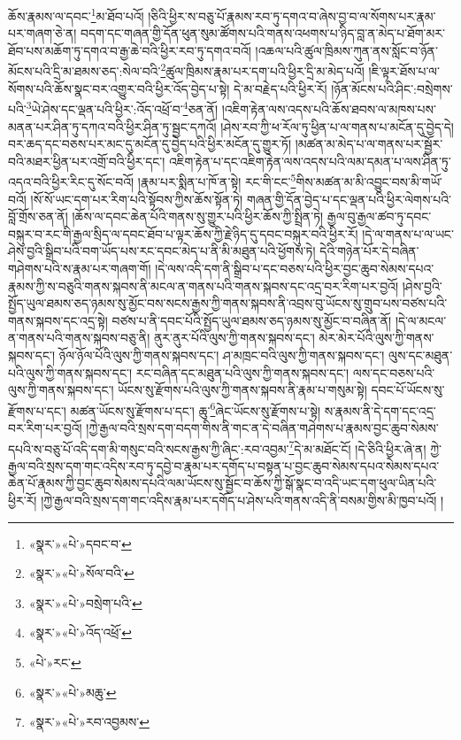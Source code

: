 ཆོས་རྣམས་ལ་དབང་\footnote{«སྣར་»«པེ་»དབང་བ་}མ་ཐོབ་པའོ། །ཅིའི་ཕྱིར་ས་བཅུ་པོ་རྣམས་རབ་ཏུ་དགའ་བ་ཞེས་བྱ་བ་ལ་སོགས་པར་རྣམ་པར་གཞག་ཅེ་ན། བདག་དང་གཞན་གྱི་དོན་ཕུན་སུམ་ཚོགས་པའི་གནས་འཕགས་པ་ཉིད་བླ་ན་མེད་པ་ཐོག་མར་ཐོབ་པས་མཆོག་ཏུ་དགའ་བ་རྒྱ་ཆེ་བའི་ཕྱིར་རབ་ཏུ་དགའ་བའོ། །འཆལ་པའི་ཚུལ་ཁྲིམས་ཀུན་ནས་སློང་བ་ཉོན་མོངས་པའི་དྲི་མ་ཐམས་ཅད་:སེལ་བའི་\footnote{«སྣར་»«པེ་»སོལ་བའི་}ཚུལ་ཁྲིམས་རྣམ་པར་དག་པའི་ཕྱིར་དྲི་མ་མེད་པའོ། །ཇི་ལྟར་ཐོས་པ་ལ་སོགས་པའི་ཆོས་སྣང་བར་འགྱུར་བའི་ཕྱིར་འོད་བྱེད་པ་སྟེ། དེ་མ་བརྗེད་པའི་ཕྱིར་རོ། །ཉོན་མོངས་པའི་ཤིང་:བསྲེགས་པའི་\footnote{«སྣར་»«པེ་»བསྲེག་པའི་}ཡེ་ཤེས་དང་ལྡན་པའི་ཕྱིར་:འོད་འཕྲོ་བ་\footnote{«སྣར་»«པེ་»འོད་འཕྲོ་}ཅན་ནོ། །འཇིག་རྟེན་ལས་འདས་པའི་ཆོས་ཐབས་ལ་མཁས་པས་མནན་པར་ཤིན་ཏུ་དཀའ་བའི་ཕྱིར་ཤིན་ཏུ་སྦྱང་དཀའོ། །ཤེས་རབ་ཀྱི་ཕ་རོལ་ཏུ་ཕྱིན་པ་ལ་གནས་པ་མངོན་དུ་བྱེད་དེ། བར་ཆད་དང་བཅས་པར་མང་དུ་མངོན་དུ་བྱེད་པའི་ཕྱིར་མངོན་དུ་གྱུར་ཏོ། །མཚན་མ་མེད་པ་ལ་གནས་པར་སྦྱོར་བའི་མཐར་ཕྱིན་པར་འགྲོ་བའི་ཕྱིར་དང་། འཇིག་རྟེན་པ་དང་འཇིག་རྟེན་ལས་འདས་པའི་ལམ་དམན་པ་ལས་ཤིན་ཏུ་འདའ་བའི་ཕྱིར་རིང་དུ་སོང་བའོ། །རྣམ་པར་སྨིན་པ་ཁོ་ན་སྟེ། རང་གི་ངང་\footnote{«པེ་»རང་}གིས་མཚན་མ་མི་འབྱུང་བས་མི་གཡོ་བའོ། །སོ་སོ་ཡང་དག་པར་རིག་པའི་སྟོབས་ཀྱིས་ཆོས་སྟོན་ཏེ། གཞན་གྱི་དོན་བྱེད་པ་དང་ལྡན་པའི་ཕྱིར་ལེགས་པའི་བློ་གྲོས་ཅན་ནོ། །ཆོས་ལ་དབང་ཆེན་པོའི་གནས་སུ་གྱུར་པའི་ཕྱིར་ཆོས་ཀྱི་སྤྲིན་ཏེ། རྒྱལ་བུ་རྒྱལ་ཚབ་ཏུ་དབང་བསྐུར་བ་རང་གི་རྒྱལ་སྲིད་ལ་དབང་ཐོབ་པ་ལྟར་ཆོས་ཀྱི་རྗེ་ཉིད་དུ་དབང་བསྐུར་བའི་ཕྱིར་རོ། །དེ་ལ་གནས་པ་ལ་ཡང་ཤེས་བྱའི་སྒྲིབ་པའི་བག་ཡོད་པས་རང་དབང་མེད་པ་ནི་མི་མཐུན་པའི་ཕྱོགས་ཏེ། དེའི་གཉེན་པོར་དེ་བཞིན་གཤེགས་པའི་ས་རྣམ་པར་གཞག་གོ། །དེ་ལས་འདི་དག་ནི་སྒྲིབ་པ་དང་བཅས་པའི་ཕྱིར་བྱང་ཆུབ་སེམས་དཔའ་རྣམས་ཀྱི་ས་བཅུའི་གནས་སྐབས་ནི་མངལ་ན་གནས་པའི་གནས་སྐབས་དང་འདྲ་བར་རིག་པར་བྱའོ། །ཤེས་བྱའི་སྤྱོད་ཡུལ་ཐམས་ཅད་ཉམས་སུ་མྱོང་བས་སངས་རྒྱས་ཀྱི་གནས་སྐབས་ནི་འབྲས་བུ་ཡོངས་སུ་གྲུབ་པས་བཙས་པའི་གནས་སྐབས་དང་འདྲ་སྟེ། བཙས་པ་ནི་དབང་པོའི་སྤྱོད་ཡུལ་ཐམས་ཅད་ཉམས་སུ་མྱོང་བ་བཞིན་ནོ། །དེ་ལ་མངལ་ན་གནས་པའི་གནས་སྐབས་བཅུ་ནི། ནུར་ནུར་པོའི་ལུས་ཀྱི་གནས་སྐབས་དང་། མེར་མེར་པོའི་ལུས་ཀྱི་གནས་སྐབས་དང་། ཉོལ་ཉོལ་པོའི་ལུས་ཀྱི་གནས་སྐབས་དང་། ཤ་མཁྲང་བའི་ལུས་ཀྱི་གནས་སྐབས་དང་། ལུས་དང་མཐུན་པའི་ལུས་ཀྱི་གནས་སྐབས་དང་། རང་བཞིན་དང་མཐུན་པའི་ལུས་ཀྱི་གནས་སྐབས་དང་། ལས་དང་བཅས་པའི་ལུས་ཀྱི་གནས་སྐབས་དང་། ཡོངས་སུ་རྫོགས་པའི་ལུས་ཀྱི་གནས་སྐབས་ནི་རྣམ་པ་གསུམ་སྟེ། དབང་པོ་ཡོངས་སུ་རྫོགས་པ་དང་། མཚན་ཡོངས་སུ་རྫོགས་པ་དང་། ཆུ་\footnote{«སྣར་»«པེ་»མཆུ་}ཞེང་ཡོངས་སུ་རྫོགས་པ་སྟེ། ས་རྣམས་ནི་དེ་དག་དང་འདྲ་བར་རིག་པར་བྱའོ། །ཀྱེ་རྒྱལ་བའི་སྲས་དག་བདག་གིས་ནི་གང་ན་དེ་བཞིན་གཤེགས་པ་རྣམས་བྱང་ཆུབ་སེམས་དཔའི་ས་བཅུ་པོ་འདི་དག་མི་གསུང་བའི་སངས་རྒྱས་ཀྱི་ཞིང་:རབ་འབྱམ་\footnote{«སྣར་»«པེ་»རབ་འབྱམས་}དེ་མ་མཐོང་ངོ། །དེ་ཅིའི་ཕྱིར་ཞེ་ན། ཀྱེ་རྒྱལ་བའི་སྲས་དག་གང་འདིས་རབ་ཏུ་དབྱེ་བ་རྣམ་པར་དགོད་པ་བསྟན་པ་བྱང་ཆུབ་སེམས་དཔའ་སེམས་དཔའ་ཆེན་པོ་རྣམས་ཀྱི་བྱང་ཆུབ་སེམས་དཔའི་ལམ་ཡོངས་སུ་སྦྱོང་བ་ཆོས་ཀྱི་སྒོ་སྣང་བ་འདི་ཡང་དག་ཕུལ་ཡིན་པའི་ཕྱིར་རོ། །ཀྱེ་རྒྱལ་བའི་སྲས་དག་གང་འདིས་རྣམ་པར་དགོད་པ་ཤེས་པའི་གནས་འདི་ནི་བསམ་གྱིས་མི་ཁྱབ་པའོ། །
